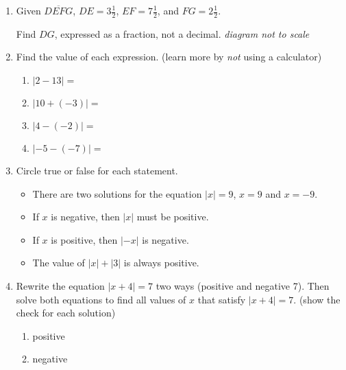 \begin{enumerate}
\newpage
\item Given $\overline{DEFG}$, $DE=3 \frac{1}{2}$, $EF=7 \frac{1}{2}$, and $FG= 2 \frac{1}{2}$. \par \medskip
Find ${DG}$, expressed as a fraction, not a decimal. \hfill  \emph{diagram not to scale} \medskip
\begin{flushleft}
\end{flushleft} \vspace{2cm}

\item Find the value of each expression. (learn more by \emph{not} using a calculator)
  \begin{multicols}{2}
    \begin{enumerate}[itemsep=1cm]
      \item $|2-13|=$
      \item $|10+(-3)|=$
      \item $|4-(-2)|=$
      \item $|-5-(-7)|=$
    \end{enumerate}
  \end{multicols} \bigskip

\item Circle true or false for each statement. \bigskip
  \begin{itemize}[label={\textbf{T \; F \;}}, itemsep=0.5cm]
    \item There are two solutions for the equation $|x|=9$, $x=9$ and $x=-9$.
    \item If $x$ is negative, then $|x|$ must be positive.
    \item If $x$ is positive, then $|-x|$ is negative.
    \item The value of $|x|+|3|$ is always positive.
  \end{itemize} \bigskip

\item Rewrite the equation $|x+4|=7$ two ways (positive and negative 7). Then solve both equations to find all values of $x$ that satisfy $|x+4|=7$. (show the check for each solution)
  \begin{multicols}{2} 
    \begin{enumerate}
      \item positive
      \item negative
    \end{enumerate}
  \end{multicols}


\end{enumerate}

